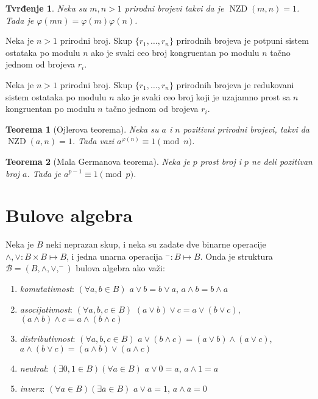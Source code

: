 \documentclass[12p,14paper]{article}
\DeclareMathOperator{\nzd}{NZD}
\newtheorem*{theorem}{Teorema}
\newtheorem*{prop}{Tvrđenje}
\begin{document}
\begin{multicols}{2}
    \begin{prop}
        Neka su $m, n > 1$ prirodni brojevi takvi da je $\nzd(m, n) = 1$. 
        Tada je $\varphi(mn) = \varphi(m)\varphi(n)$.
    \end{prop}

    Neka je $n > 1$ prirodni broj. Skup $\{ r_1, \ldots, r_n \}$ prirodnih 
    brojeva je potpuni sistem ostataka po modulu $n$ ako je svaki ceo broj 
    kongruentan po modulu $n$ tačno jednom od brojeva $r_i$.

    Neka je $n > 1$ prirodni broj. Skup $\{ r_1, \ldots, r_n \}$ prirodnih 
    brojeva je redukovani sistem ostataka po modulu $n$ ako je svaki ceo broj 
    koji je uzajamno prost sa $n$ kongruentan po modulu $n$ tačno jednom od 
    brojeva $r_i$.

    \begin{theorem}[Ojlerova teorema]
        Neka su $a$ i $n$ pozitivni prirodni brojevi, takvi da 
        $\nzd(a, n) = 1$.
        Tada vazi $a^{\varphi(n)} \equiv 1 \pmod n$.
    \end{theorem}

    \begin{theorem}[Mala Germanova teorema]
        Neka je $p$ prost broj i $p$ ne deli pozitivan broj $a$. 
        Tada je $a^{p-1} \equiv 1 \pmod p$.
    \end{theorem}

\section{Bulove algebra}

    Neka je $B$ neki neprazan skup, i neka su zadate dve binarne operacije 
    $\land, \lor : B \times B \mapsto B$, i jedna unarna operacija 
    $^{-} : B \mapsto B$. Onda je struktura 
    $\mathcal{B} = (B, \land, \lor, ^{-})$ 
    bulova algebra ako važi:
    \begin{enumerate}
        \itemsep0em
        \item [B.1] \textit{komutativnost}:
            $(\forall a,b \in B)$ 
            $a \lor b = b \lor a$, 
            $a \land b = b \land a$
        \item [B.2] \textit{asocijativnost}:
            $(\forall a,b,c \in B)$ 
            $(a \lor b) \lor c = a \lor (b \lor c)$, 
            $(a \land b) \land c = a \land (b \land c)$
        \item [B.3] \textit{distributivnost}:
            $(\forall a,b,c \in B)$ 
            $a \lor (b \land c) = (a \lor b) \land (a \lor c)$,
            $a \land (b \lor c) = (a \land b) \lor (a \land c)$
        \item [B.4] \textit{neutral}:
            $(\exists 0,1 \in B)(\forall a \in B)$ 
            $a \lor 0 = a$, 
            $a \land 1 = a$
        \item [B.5] \textit{inverz}:
            $(\forall a \in B)(\exists \overline{a} \in B)$ 
            $a \lor \overline{a} = 1$, 
            $a \land \overline{a} = 0$
    \end{enumerate}


\end{multicols}
\end{document}
